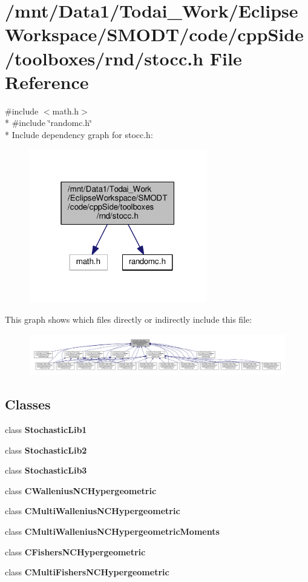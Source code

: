 \section{/mnt/\-Data1/\-Todai\-\_\-\-Work/\-Eclipse\-Workspace/\-S\-M\-O\-D\-T/code/cpp\-Side/toolboxes/rnd/stocc.h File Reference}
\label{toolboxes_2rnd_2stocc_8h}
{\ttfamily \#include $<$math.\-h$>$}\\*
{\ttfamily \#include \char`\"{}randomc.\-h\char`\"{}}\\*
Include dependency graph for stocc.\-h\-:
\nopagebreak
\begin{figure}[H]
\begin{center}
\leavevmode
\includegraphics[width=220pt]{toolboxes_2rnd_2stocc_8h__incl}
\end{center}
\end{figure}
This graph shows which files directly or indirectly include this file\-:
\nopagebreak
\begin{figure}[H]
\begin{center}
\leavevmode
\includegraphics[width=350pt]{toolboxes_2rnd_2stocc_8h__dep__incl}
\end{center}
\end{figure}
\subsection*{Classes}
\begin{DoxyCompactItemize}
\item 
class {\bf Stochastic\-Lib1}
\item 
class {\bf Stochastic\-Lib2}
\item 
class {\bf Stochastic\-Lib3}
\item 
class {\bf C\-Wallenius\-N\-C\-Hypergeometric}
\item 
class {\bf C\-Multi\-Wallenius\-N\-C\-Hypergeometric}
\item 
class {\bf C\-Multi\-Wallenius\-N\-C\-Hypergeometric\-Moments}
\item 
class {\bf C\-Fishers\-N\-C\-Hypergeometric}
\item 
class {\bf C\-Multi\-Fishers\-N\-C\-Hypergeometric}
\end{DoxyCompactItemize}
